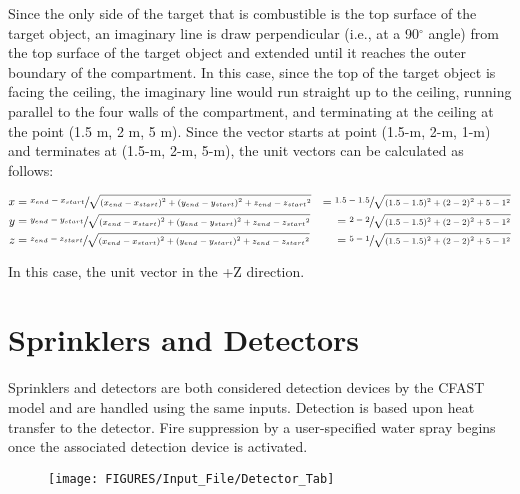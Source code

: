 Since the only side of the target that is combustible is the top surface of the target object, an imaginary line is draw perpendicular (i.e., at a 90$^\circ$ angle) from the top surface of the target object and extended until it reaches the outer boundary of the compartment.  In this case, since the top of the target object is facing the ceiling, the imaginary line would run straight up to the ceiling, running parallel to the four walls of the compartment, and terminating at the ceiling at the point (1.5 m, 2 m, 5 m).  Since the vector starts at point (1.5-m, 2-m, 1-m) and terminates at (1.5-m, 2-m, 5-m), the unit vectors can be calculated as follows:


\begin{equation}
  \begin{aligned}
 x &= \sfrac{x_{end} - x_{start}}{\sqrt{{ \left( {x_{end} - x_{start}} \right) }^2 + { \left( {y_{end} - y_{start}} \right) }^2 + {z_{end} - z_{start}}^2}} &= \sfrac{1.5 - 1.5}{\sqrt{{ \left( {1.5 - 1.5} \right) }^2 + { \left( {2 - 2} \right) }^2 + {5 - 1}^2}} \\
 y &= \sfrac{y_{end} - y_{start}}{\sqrt{{ \left( {x_{end} - x_{start}} \right) }^2 + { \left( {y_{end} - y_{start}} \right) }^2 + {z_{end} - z_{start}}^2}} &= \sfrac{2 - 2}{\sqrt{{ \left( {1.5 - 1.5} \right) }^2 + { \left( {2 - 2} \right) }^2 + {5 - 1}^2}} \\
 z &= \sfrac{z_{end} - z_{start}}{\sqrt{{ \left( {x_{end} - x_{start}} \right) }^2 + { \left( {y_{end} - y_{start}} \right) }^2 + {z_{end} - z_{start}}^2}}  &= \sfrac{5 - 1}{\sqrt{{ \left( {1.5 - 1.5} \right) }^2 + { \left( {2 - 2} \right) }^2 + {5 - 1}^2}} \\
  \end{aligned}
\end{equation}

In this case, the unit vector in the +Z direction.



\chapter{Sprinklers and Detectors}

Sprinklers and detectors are both considered detection devices by the CFAST model and are handled using the same inputs.  Detection is based upon heat transfer to the detector. Fire suppression by a user-specified water spray begins once the associated detection device is activated.

\begin{figure}[h!]
\begin{center}
\texttt{[image: FIGURES/Input\_File/Detector\_Tab]}
\end{center}
\end{figure}

